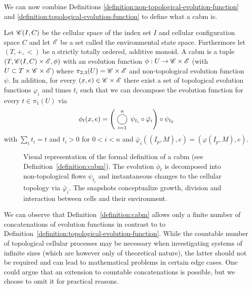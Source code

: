 We can now combine Definitions \ref{definition:non-topological-evolution-function} and
\ref{definition:topological-evolution-function} to define what a \ac{cabm} is.

\begin{definition}
    Let $\mathscr{C}(I,C)$ be the cellular space of the index set $I$ and cellular configuration space $C$
    and let $\mathscr{E}$ be a set called the environmental state space.
    Furthermore let $(T,+,<)$ be a strictly totally ordered, additive monoid.
    A \acl{cabm} is a tuple $(T,\mathscr{C}(I,C)\times\mathscr{E},\phi)$ with an evolution function
    $\phi:U\rightarrow\mathscr{C}\times\mathscr{E}$ (with $U\subset T\times\mathscr{C}\times\mathscr{E}$) where
    $\pi_{2,3}(U)=\mathscr{C}\times\mathscr{E}$ and non-topological evolution function $\psi$.
    In addition, for every $(x,e)\in\mathscr{C}\times\mathscr{E}$ there exist a set of topological evolution
    functions $\varphi_i$ and times $t_i$ such that we can decompose the evolution function for
    every $t\in\pi_1(U)$ via
    \begin{equation}
        \phi_t(x,e) = \left(\bigcomp_{i=1}^n\psi_{t_i}\circ\bar{\varphi}_i\right) \circ \psi_{t_0}
        \label{eq:cabm-evolution-function}
    \end{equation}
    with $\sum_i t_i=t$ and $t_i>0$ for $0<i<n$ and $\bar{\varphi}_i((I_p,M),e)=(\varphi(I_p,M),e)$.
    \label{definition:cabm}
\end{definition}

\begin{figure}
    \centering
    
    \caption[Visualization the \ac{cabm} Definition]{
        Visual representation of the formal definition of a \ac{cabm} (see
        Definition~\ref{definition:cabm}).
        The evolution $\phi_t$ is decomposed into non-topological flows $\psi_{t_i}$ and
        instantaneous changes to the cellular topology via $\bar{\varphi}_i$.
        The snapshots conceptualize growth, division and interaction between cells and their
        environment.
    }
    \label{fig:theory-cabm-concept}
\end{figure}

We can observe that Definition~\ref{definition:cabm} allows only a finite number of concatenations
of evolution functions in contrast to to Definition~\ref{definition:topological-evolution-function}.
While the countable number of topological cellular processes may be necessary when investigating
systems of infinite sizes (which are however only of theoretical nature), the latter should not be
required and can lead to mathematical problems in certain edge cases.
One could argue that an extension to countable concatenations is possible, but we choose to omit it
for practical reasons.

